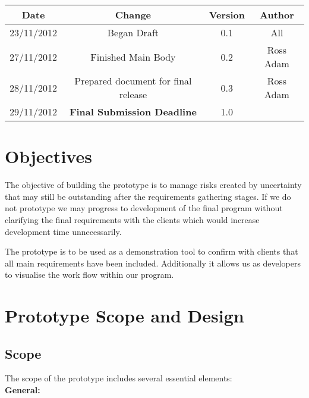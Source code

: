 \documentclass{l3deliverable}
\begin{document}
\begin{center}{
\begin{tabular}{|c|c|c|c|}
\hline \textbf{Date} &\textbf{ Change} & \textbf{Version} &\textbf{Author}\\ 
\hline  23/11/2012 & Began Draft & 0.1 & All\\
\hline 27/11/2012 & Finished Main Body & 0.2 & Ross Adam\\
\hline 28/11/2012 & Prepared document for final release & 0.3 & Ross
Adam\\
\hline 29/11/2012 & \textbf{Final Submission Deadline} & 1.0 &  \\ 
\hline 
\end{tabular} }
\end{center}


\section{Objectives}

The objective of building the prototype is to manage risks created by uncertainty that may still be outstanding after the requirements gathering stages. If we do not prototype we may progress to development of the final program without clarifying the final requirements with the clients which would increase development time unnecessarily.

The prototype is to be used as a demonstration tool to confirm with clients that all main requirements have been included. Additionally it allows us as developers to visualise the work flow within our program. 


\section{Prototype Scope and Design}

\subsection{Scope}

The scope of the prototype includes several essential elements:\\

\textbf{General:}\\
\end{document}
